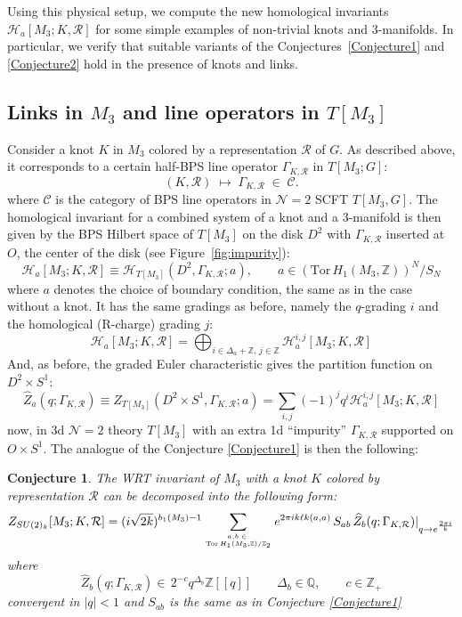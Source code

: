 \documentclass[hyper,letterpaper]{JHEP3}
\newcommand{\Z}{{\mathbb Z}}
\newcommand{\Q}{{\mathbb Q}}
\renewcommand{\hat}{\widehat}
\def\CC{{\mathcal C}}
\def\CH{{\mathcal H}}
\def\CN{{\mathcal N}}
\def\CR{{\mathcal R}}
\def\lk{{\ell k}}
\def\Tor{{\mathrm{Tor}\,}}
\newtheorem{conj}{Conjecture}[section]
\begin{document}
Using this physical setup, we compute the new homological invariants $\CH_a[M_3;K,\CR]$ for some simple examples
of non-trivial knots and 3-manifolds. In particular, we verify that suitable variants of the Conjectures~\ref{Conjecture1} and \ref{Conjecture2}
hold in the presence of knots and links.

\subsection{Links in ${M_3}$ and line operators in ${T[M_3]}$}
\label{sec:knots}

Consider a knot $K$ in $M_3$ colored by a representation $\CR$ of $G$.
As described above, it corresponds to a certain half-BPS line operator $\Gamma_{K,\CR}$ in $T[M_3;G]$:
\begin{equation}
	(K,\CR)\;\longmapsto \; \Gamma_{K,\CR}\;\in\;\CC.
	\label{Knots-LineOps}
\end{equation}
where $\CC$ is the category of BPS line operators in $\CN=2$ SCFT $T[M_3,G]$.
The homological invariant for a combined system of a knot and a 3-manifold
is then given by the BPS Hilbert space of $T[M_3]$ on the disk $D^2$ with $\Gamma_{K,\CR}$ inserted at $O$,
the center of the disk (see Figure~\ref{fig:impurity}):
\begin{equation}
	\CH_a[M_3;K,\CR]\equiv \CH_{T[M_3]}(D^2,\Gamma_{K,\CR};a),\qquad a\in (\text{Tor}\,H_1(M_3,\Z))^N/S_N
\end{equation}
where $a$ denotes the choice of boundary condition, the same as in the case without a knot.
It has the same gradings as before, namely the $q$-grading $i$ and the homological (R-charge) grading $j$:
\begin{equation}
	\CH_a[M_3;K,\CR]=\bigoplus_{i\in \Delta_a+\Z,\,j\in\Z}\CH_a^{i,j}[M_3;K,\CR]
\end{equation}
And, as before, the graded Euler characteristic gives the partition function on $D^2\times S^1$:
\begin{equation}
	\hat{Z}_a(q;\Gamma_{K,\CR})\equiv Z_{T[M_3]}(D^2\times S^1,\Gamma_{K,\CR};a)=
	\sum_{i,j}(-1)^jq^i\CH_a^{i,j}[M_3;K,\CR]
\end{equation}
now, in 3d $\CN=2$ theory $T[M_3]$ with an extra 1d ``impurity'' $\Gamma_{K,\CR}$ supported on $O\times S^1$.
The analogue of the Conjecture \ref{Conjecture1} is then the following:
\begin{conj}
The WRT invariant of $M_3$ with a knot $K$ colored by representation $\CR$ can be decomposed into the following form:
\begin{equation}
	Z_{SU(2)_k}[M_3;K,\CR]=(i\sqrt{2k})^{b_1(M_3)-1}\sum_{a,b\;\in \;\atop\Tor H_1(M_3,\Z)/\Z_2}e^{2\pi ik\lk(a,a)}\,S_{ab}
	\, \hat{Z}_b(q;\Gamma_{K,\CR})|_{q\rightarrow e^{\frac{2\pi i }{k}}}
	\label{WRT-knot-decomposition}
\end{equation}
where
\begin{equation}
	\hat{Z}_b(q;\Gamma_{K,\CR}) \in \, 2^{-c} q^{\Delta_b} \Z[[q]]\qquad \Delta_b\in \Q,\qquad c\in\Z_+
	\label{Block-knot-qSeries}
\end{equation}
convergent in $|q|<1$ and $S_{ab}$ is the same as in Conjecture \ref{Conjecture1}
\label{Conjecture3}
\end{conj}
\end{document}
